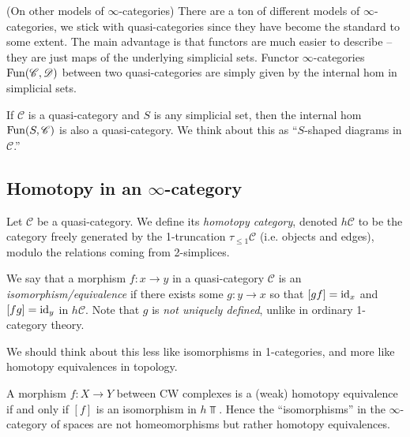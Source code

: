 \documentclass[11pt]{amsart}
\begin{document}
\begin{remark} (On other models of $\infty$-categories) There are a ton of different models of $\infty$-categories, we stick with quasi-categories since they have become the standard to some extent. The main advantage is that functors are much easier to describe -- they are just maps of the underlying simplicial sets. Functor $\infty$-categories $\mathrm{Fun}(\mathscr{C},\mathscr{D})$ between two quasi-categories are simply given by the internal hom in simplicial sets.
\end{remark}

\begin{proposition} If $\mathscr{C}$ is a quasi-category and $S$ is any simplicial set, then the internal hom $\mathrm{Fun}(S,\mathscr{C})$ is also a quasi-category. We think about this as ``$S$-shaped diagrams in $\mathscr{C}$.''
\end{proposition}



\subsection{Homotopy in an $\infty$-category}



\begin{definition}\label{def:homotopy-category-of-quasicategory} 
Let $\mathscr{C}$ be a quasi-category. We define its \textit{homotopy category}, denoted $h\mathscr{C}$ to be the category freely generated by the 1-truncation $\tau_{\le 1} \mathscr{C}$ (i.e. objects and edges), modulo the relations coming from 2-simplices.
\end{definition}

\begin{definition} We say that a morphism $f \colon x \to y$ in a quasi-category $\mathscr{C}$ is an \textit{isomorphism/equivalence} if there exists some $g \colon y \to x$ so that $[gf]=\mathrm{id}_x$ and $[fg]=\mathrm{id}_y$ in $h\mathscr{C}$. Note that $g$ is \textit{not uniquely defined}, unlike in ordinary 1-category theory.
\end{definition}

\begin{remark} We should think about this less like isomorphisms in 1-categories, and more like homotopy equivalences in topology.
\end{remark}

\begin{example} A morphism $f\colon X\to Y$ between CW complexes is a (weak) homotopy equivalence if and only if $[f]$ is an isomorphism in $h\Top$. Hence the ``isomorphisms'' in the $\infty$-category of spaces are not homeomorphisms but rather homotopy equivalences.
\end{example}
\end{document}
